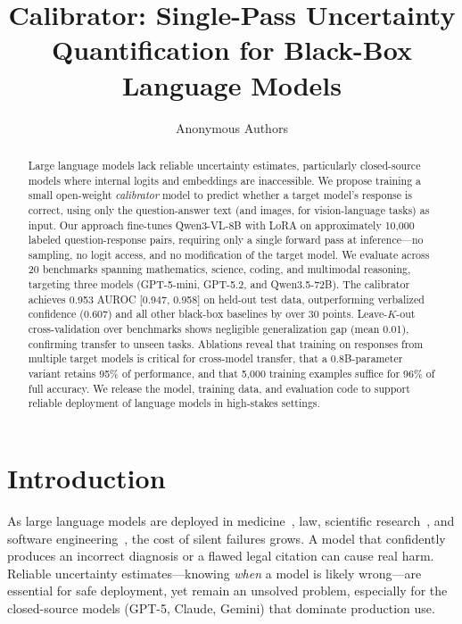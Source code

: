 \documentclass{colm2026}
\title{Calibrator: Single-Pass Uncertainty Quantification for Black-Box Language Models}
\author{
  Anonymous Authors
}
\begin{document}
\maketitle

\begin{abstract}
Large language models lack reliable uncertainty estimates, particularly closed-source models where internal logits and embeddings are inaccessible. We propose training a small open-weight \emph{calibrator} model to predict whether a target model's response is correct, using only the question-answer text (and images, for vision-language tasks) as input. Our approach fine-tunes Qwen3-VL-8B with LoRA on approximately 10,000 labeled question-response pairs, requiring only a single forward pass at inference---no sampling, no logit access, and no modification of the target model. We evaluate across 20 benchmarks spanning mathematics, science, coding, and multimodal reasoning, targeting three models (GPT-5-mini, GPT-5.2, and Qwen3.5-72B). The calibrator achieves 0.953 AUROC [0.947, 0.958] on held-out test data, outperforming verbalized confidence (0.607) and all other black-box baselines by over 30 points. Leave-$K$-out cross-validation over benchmarks shows negligible generalization gap (mean 0.01), confirming transfer to unseen tasks. Ablations reveal that training on responses from multiple target models is critical for cross-model transfer, that a 0.8B-parameter variant retains 95\% of performance, and that 5{,}000 training examples suffice for 96\% of full accuracy. We release the model, training data, and evaluation code to support reliable deployment of language models in high-stakes settings.
\end{abstract}

\section{Introduction}
\label{sec:intro}

As large language models are deployed in medicine~\citep{healthbench}, law, scientific research~\citep{gpqa}, and software engineering~\citep{prbench}, the cost of silent failures grows. A model that confidently produces an incorrect diagnosis or a flawed legal citation can cause real harm. Reliable uncertainty estimates---knowing \emph{when} a model is likely wrong---are essential for safe deployment, yet remain an unsolved problem, especially for the closed-source models (GPT-5, Claude, Gemini) that dominate production use.
\end{document}
